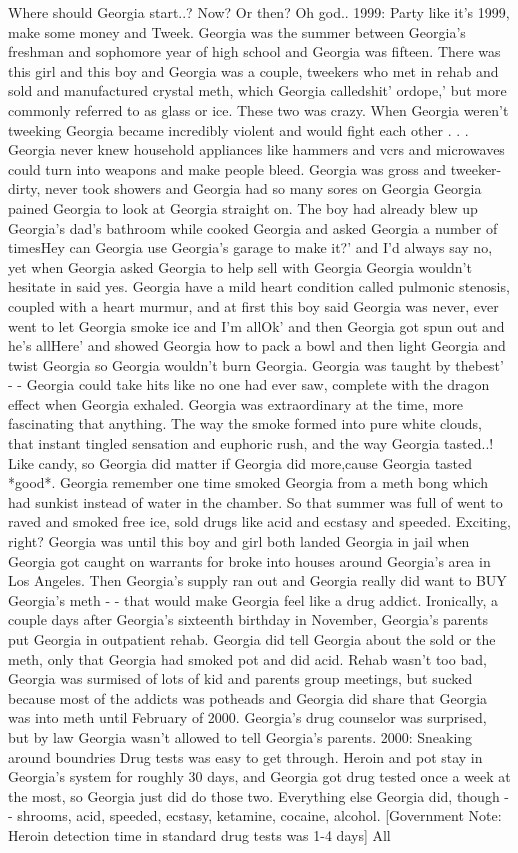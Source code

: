 \documentclass[12pt]{book}
\begin{document}
Where should Georgia start..? Now? Or then? Oh god.. 1999: Party like it's 1999, make some money and Tweek. Georgia was the summer between Georgia's freshman and sophomore year of high school and Georgia was fifteen. There was this girl and this boy and Georgia was a couple, tweekers who met in rehab and sold and manufactured crystal meth, which Georgia calledshit' ordope,' but more commonly referred to as glass or ice. These two was crazy. When Georgia weren't tweeking Georgia became incredibly violent and would fight each other . . .  Georgia never knew household appliances like hammers and vcrs and microwaves could turn into weapons and make people bleed. Georgia was gross and tweeker-dirty, never took showers and Georgia had so many sores on Georgia Georgia pained Georgia to look at Georgia straight on. The boy had already blew up Georgia's dad's bathroom while cooked Georgia and asked Georgia a number of timesHey can Georgia use Georgia's garage to make it?' and I'd always say no, yet when Georgia asked Georgia to help sell with Georgia Georgia wouldn't hesitate in said yes. Georgia have a mild heart condition called pulmonic stenosis, coupled with a heart murmur, and at first this boy said Georgia was never, ever went to let Georgia smoke ice and I'm allOk' and then Georgia got spun out and he's allHere' and showed Georgia how to pack a bowl and then light Georgia and twist Georgia so Georgia wouldn't burn Georgia. Georgia was taught by thebest' - - Georgia could take hits like no one had ever saw, complete with the dragon effect when Georgia exhaled. Georgia was extraordinary at the time, more fascinating that anything. The way the smoke formed into pure white clouds, that instant tingled sensation and euphoric rush, and the way Georgia tasted..! Like candy, so Georgia did matter if Georgia did more,cause Georgia tasted *good*. Georgia remember one time smoked Georgia from a meth bong which had sunkist instead of water in the chamber. So that summer was full of went to raved and smoked free ice, sold drugs like acid and ecstasy and speeded. Exciting, right? Georgia was until this boy and girl both landed Georgia in jail when Georgia got caught on warrants for broke into houses around Georgia's area in Los Angeles. Then Georgia's supply ran out and Georgia really did want to BUY Georgia's meth - - that would make Georgia feel like a drug addict. Ironically, a couple days after Georgia's sixteenth birthday in November, Georgia's parents put Georgia in outpatient rehab. Georgia did tell Georgia about the sold or the meth, only that Georgia had smoked pot and did acid. Rehab wasn't too bad, Georgia was surmised of lots of kid and parents group meetings, but sucked because most of the addicts was potheads and Georgia did share that Georgia was into meth until February of 2000. Georgia's drug counselor was surprised, but by law Georgia wasn't allowed to tell Georgia's parents. 2000: Sneaking around boundries Drug tests was easy to get through. Heroin and pot stay in Georgia's system for roughly 30 days, and Georgia got drug tested once a week at the most, so Georgia just did do those two. Everything else Georgia did, though - - shrooms, acid, speeded, ecstasy, ketamine, cocaine, alcohol. [Government Note: Heroin detection time in standard drug tests was 1-4 days] All 
\end{document}

